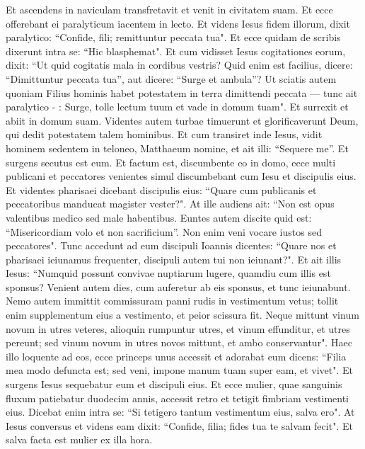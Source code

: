 \begin{biblechapter}  
\verse Et ascendens in naviculam transfretavit et venit in civitatem suam.  
\verse Et ecce offerebant ei paralyticum iacentem in lecto. Et videns Iesus fidem illorum, dixit paralytico: “Confide, fili; remittuntur peccata tua". 
\verse Et ecce quidam de scribis dixerunt intra se: “Hic blasphemat". 
\verse Et cum vidisset Iesus cogitationes eorum, dixit: “Ut quid cogitatis mala in cordibus vestris? 
\verse Quid enim est facilius, dicere: “Dimittuntur peccata tua”, aut dicere: “Surge et ambula”? 
\verse Ut sciatis autem quoniam Filius hominis habet potestatem in terra dimittendi peccata — tunc ait paralytico - : Surge, tolle lectum tuum et vade in domum tuam". 
\verse Et surrexit et abiit in domum suam.  
\verse Videntes autem turbae timuerunt et glorificaverunt Deum, qui dedit potestatem talem hominibus. 
\verse Et cum transiret inde Iesus, vidit hominem sedentem in teloneo, Matthaeum nomine, et ait illi: “Sequere me”. Et surgens secutus est eum. 
\verse Et factum est, discumbente eo in domo, ecce multi publicani et peccatores venientes simul discumbebant cum Iesu et discipulis eius. 
\verse Et videntes pharisaei dicebant discipulis eius: “Quare cum publicanis et peccatoribus manducat magister vester?". 
\verse At ille audiens ait: “Non est opus valentibus medico sed male habentibus. 
\verse Euntes autem discite quid est: “Misericordiam volo et non sacrificium”. Non enim veni vocare iustos sed peccatores". 
\verse Tunc accedunt ad eum discipuli Ioannis dicentes: “Quare nos et pharisaei ieiunamus frequenter, discipuli autem tui non ieiunant?". 
\verse Et ait illis Iesus: “Numquid possunt convivae nuptiarum lugere, quamdiu cum illis est sponsus? Venient autem dies, cum auferetur ab eis sponsus, et tunc ieiunabunt. 
\verse Nemo autem immittit commissuram panni rudis in vestimentum vetus; tollit enim supplementum eius a vestimento, et peior scissura fit. 
\verse Neque mittunt vinum novum in utres veteres, alioquin rumpuntur utres, et vinum effunditur, et utres pereunt; sed vinum novum in utres novos mittunt, et ambo conservantur". 
\verse Haec illo loquente ad eos, ecce princeps unus accessit et adorabat eum dicens: “Filia mea modo defuncta est; sed veni, impone manum tuam super eam, et vivet". 
\verse Et surgens Iesus sequebatur eum et discipuli eius. 
\verse Et ecce mulier, quae sanguinis fluxum patiebatur duodecim annis, accessit retro et tetigit fimbriam vestimenti eius. 
\verse Dicebat enim intra se: “Si tetigero tantum vestimentum eius, salva ero". 
\verse At Iesus conversus et videns eam dixit: “Confide, filia; fides tua te salvam fecit". Et salva facta est mulier ex illa hora. 

\end{biblechapter}
